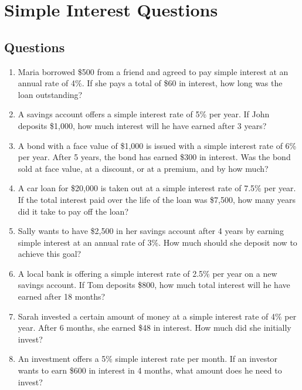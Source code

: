 \documentclass{article}
\begin{document}
\section*{Simple Interest Questions}

\subsection*{Questions}
\begin{enumerate}
  \item Maria borrowed \$500 from a friend and agreed to pay simple interest at an annual rate of 4\%. If she pays a total of \$60 in interest, how long was the loan outstanding?
  \vspace{2cm}
  
  \item A savings account offers a simple interest rate of 5\% per year. If John deposits \$1,000, how much interest will he have earned after 3 years?
  \vspace{2cm}
  
  \item A bond with a face value of \$1,000 is issued with a simple interest rate of 6\% per year. After 5 years, the bond has earned \$300 in interest. Was the bond sold at face value, at a discount, or at a premium, and by how much?
  \vspace{2cm}
  
  \item A car loan for \$20,000 is taken out at a simple interest rate of 7.5\% per year. If the total interest paid over the life of the loan was \$7,500, how many years did it take to pay off the loan?
  \vspace{2cm}
  
  \item Sally wants to have \$2,500 in her savings account after 4 years by earning simple interest at an annual rate of 3\%. How much should she deposit now to achieve this goal?
  \vspace{2cm}
  
  \item A local bank is offering a simple interest rate of 2.5\% per year on a new savings account. If Tom deposits \$800, how much total interest will he have earned after 18 months?
  \vspace{2cm}
  
  \item Sarah invested a certain amount of money at a simple interest rate of 4\% per year. After 6 months, she earned \$48 in interest. How much did she initially invest?
  \vspace{2cm}
  
  \item An investment offers a 5\% simple interest rate per month. If an investor wants to earn \$600 in interest in 4 months, what amount does he need to invest?
  \vspace{2cm}
\end{enumerate}
\end{document}
